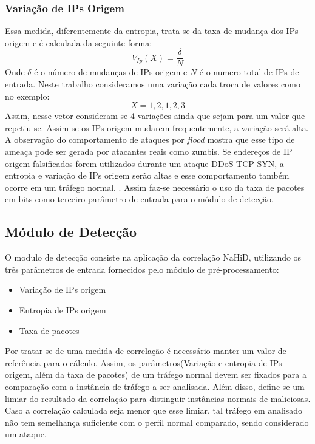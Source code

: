 \subsubsection{Variação de IPs Origem}
Essa medida, diferentemente da entropia, trata-se da taxa de mudança dos IPs origem e é calculada da seguinte forma:
\begin{equation}
	V_{Ip}(X) = \frac{\delta}{N}
\end{equation}
Onde $\delta$ é o número de mudanças de IPs origem e $N$ é o numero total de IPs de entrada. Neste trabalho consideramos uma variação cada troca de valores como no exemplo:
\begin{equation}
	X = {1,2,1,2,3}
\end{equation}
Assim, nesse vetor consideram-se 4 variações ainda que sejam para um valor que repetiu-se. Assim se os IPs origem mudarem frequentemente, a variação será alta. \cite{HOQUE201748}
\\
A observação do comportamento de ataques por \textit{flood} mostra que esse tipo de ameaça pode ser gerada por atacantes reais como zumbis. Se endereços de IP origem falsificados forem utilizados durante um ataque DDoS TCP SYN, a entropia e variação de IPs origem serão altas e esse comportamento também ocorre em um tráfego normal. \cite{HOQUE201748}. Assim faz-se necessário o uso da taxa de pacotes em bits como terceiro parâmetro de entrada para o módulo de detecção.

\subsection{Módulo de Detecção}
O modulo de detecção consiste na aplicação da correlação NaHiD, utilizando os três parâmetros de entrada fornecidos pelo módulo de pré-processamento:
\begin{itemize}
	\item Variação de IPs origem
	\item Entropia de IPs origem
	\item Taxa de pacotes
\end{itemize}
Por tratar-se de uma medida de correlação é necessário manter um valor de referência para o cálculo. Assim, os parâmetros(Variação e entropia de IPs origem, além da taxa de pacotes) de um tráfego normal devem ser fixados para a comparação com a instância de tráfego a ser analisada. Além disso, define-se um limiar do resultado da correlação para distinguir instâncias normais de maliciosas. Caso a correlação calculada seja menor que esse limiar, tal tráfego em analisado não tem semelhança suficiente com o perfil normal comparado, sendo considerado um ataque.
